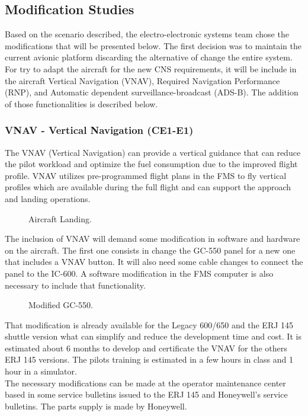 \subsection{Modification Studies}

Based on the scenario described, the electro-electronic systems team chose the modifications that will be presented below. The first decision was to maintain the current avionic platform discarding the alternative of change the entire system.
\\For try to adapt the aircraft for the new CNS requirements, it will be include in the aircraft Vertical Navigation (VNAV), Required Navigation Performance (RNP),  and Automatic dependent surveillance-broadcast (ADS-B). The addition of those functionalities is described below.

\subsubsection{VNAV - Vertical Navigation (CE1-E1)}
The VNAV (Vertical Navigation) can provide a vertical guidance that can reduce the pilot workload and optimize the fuel consumption due to the improved flight profile. VNAV utilizes pre-programmed flight plans in the FMS to fly vertical profiles which are available during the full flight and can support the approach and landing operations.

\begin{figure}[H] %
\caption{Aircraft Landing.}
\label{fig:AircraftLanding}
\end{figure}

The inclusion of VNAV will demand some modification in software and hardware on the aircraft. The first one consists in change the GC-550 panel for a new one that includes a VNAV button. It will also need some cable changes to connect the panel to the IC-600. A software modification in the FMS computer is also necessary to include that functionality.

\begin{figure}[H] %
\caption{Modified GC-550.}
\label{fig:ModifiedGC550}
\end{figure}

That modification is already available for the Legacy 600/650 and the ERJ 145 shuttle version what can simplify and reduce the development time and cost. It is estimated about 6 months to develop and certificate the VNAV for the others ERJ 145 versions. The pilots training is estimated in a few hours in class and 1 hour in a simulator.
\\The necessary modifications can be made at the operator maintenance center based in some service bulletins issued to the ERJ 145 and Honeywell's service bulletins. The parts supply is made by Honeywell.

